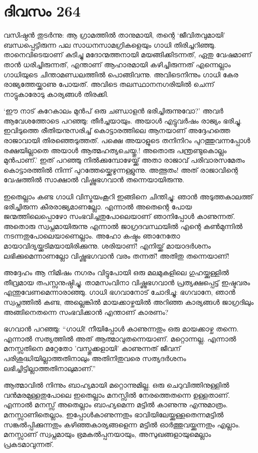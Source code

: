 \section{ദിവസം 264}


വസിഷ്ഠന്‍ തുടര്‍ന്നു: ആ ഗ്രാമത്തില്‍ താനുമായി, തന്റെ ‘ജീവിതവുമായി’ ബന്ധപ്പെട്ടിരുന്ന പല സാധനസാമഗ്രികളെയും ഗാധി തിരിച്ചറിഞ്ഞു. താനെവിടെയാണ് കുടിച്ചു മദോന്മത്തനായി മയങ്ങിക്കിടന്നത്, ഏതു വേഷമാണ് താന്‍ ധരിച്ചിരുന്നത്, എന്താണ് ആഹാരമായി കഴിച്ചിരുന്നത് എന്നെല്ലാം ഗാധിയുടെ ചിന്താമണ്ഡലത്തില്‍ പൊങ്ങിവന്നു. അവിടെനിന്നും ഗാധി കേര രാജ്യത്തേയ്ക്കാണു പോയത്. അവിടെ തലസ്ഥാനനഗരിയില്‍ ചെന്ന് നാട്ടുകാരോടു കാര്യങ്ങള്‍ തിരക്കി.

‘ഈ നാട് കുറേകാലം മുന്‍പ് ഒരു ചണ്ഡാളന്‍  ഭരിച്ചിരുന്നുവോ?’ അവര്‍ ആവേശത്തോടെ പറഞ്ഞു: തീര്‍ച്ചയായും. അയാള്‍ എട്ടുവര്‍ഷം രാജ്യം ഭരിച്ചു. ഇവിടുത്തെ രീതിയനുസരിച്ച് കൊട്ടാരത്തിലെ ആനയാണ് അദ്ദേഹത്തെ രാജാവായി തിരഞ്ഞെടുത്തത്. പക്ഷെ അയാളുടെ തനിനിറം പുറത്തുവന്നപ്പോള്‍ രക്ഷയില്ലാതെ അയാള്‍ ആത്മഹത്യചെയ്തു.! അതൊരു പന്ത്രണ്ടുകൊല്ലം മുന്‍പാണ്.’ ഇത് പറഞ്ഞു നില്‍ക്കുമ്പോഴേയ്ക്ക് അതാ രാജാവ് പരിവാരസമേതം കൊട്ടാരത്തില്‍ നിന്ന് പുറത്തേയ്ക്കെഴുന്നള്ളുന്നു. അത്ഭുതം! അത് രാജാവിന്റെ വേഷത്തില്‍ സാക്ഷാല്‍ വിഷ്ണുഭഗവാന്‍ തന്നെയായിരുന്നു.

ഇതെല്ലാം കണ്ട ഗാധി വിസ്മയംകൂറി ഇങ്ങിനെ ചിന്തിച്ചു: ഞാന്‍ അടുത്തകാലത്ത് ഭരിച്ചിരുന്ന കീരരാജ്യമാണല്ലോ. എന്നാല്‍ അതെന്റെ പോയ ജന്മത്തിലെപ്പൊഴോ സംഭവിച്ചതുപോലെയാണ് ഞാനിപ്പോള്‍ കാണുന്നത്. അതൊരു സ്വപ്നമായിരുന്നു എന്നാല്‍ ജാഗ്രദവസ്ഥയില്‍ എന്റെ കണ്‍മുന്നില്‍ നടന്നതുപോലെയാണെല്ലാം. അഹോ കഷ്ടം ഞാനേതോ മായാവിദ്യയ്ക്കടിമയായിരിക്കുന്നു. ശരിയാണ്! എനിയ്ക്ക് മായാദര്‍ശനം ലഭിക്കുമെന്നാണല്ലോ വിഷ്ണുഭഗവാന്‍ വരം തന്നത്! അതിതു തന്നെയാണ്!  

അദ്ദേഹം ആ നിമിഷം നഗരം വിട്ടുപോയി ഒരു മലമുകളിലെ ഗുഹയ്ക്കുള്ളില്‍ തീവ്രമായ തപസ്സനുഷ്ഠിച്ചു. താമസംവിനാ വിഷ്ണുഭഗവാന്‍ പ്രത്യക്ഷപ്പെട്ട് ഇഷ്ടവരം എന്തുവേണമെന്നാരാഞ്ഞു. ഗാധി ഭഗവാനോട് ചോദിച്ചു: ഭഗവാനേ, ഞാന്‍ സ്വപ്നത്തില്‍ കണ്ട, അല്ലെങ്കില്‍ മായക്കാഴ്ചയില്‍ അറിഞ്ഞ കാര്യങ്ങള്‍ ജാഗ്രദിലും അങ്ങിനെതന്നെ സംഭവിക്കാന്‍ എന്താണ് കാരണം?

ഭഗവാന്‍ പറഞ്ഞു: “ഗാധി! നീയിപ്പോള്‍ കാണുന്നതും ഒരു മായക്കാഴ്ച തന്നെ. എന്നാല്‍ സത്യത്തില്‍ അത് ആത്മാവുതന്നെയാണ്. മറ്റൊന്നല്ല. എന്നാല്‍ മനസ്സതിനെ മറ്റേതോ 'വസ്തുക്കളായി' കാണുന്നത് ജീവന് പരിശുദ്ധിയില്ലാത്തതിനാലും അതിനിതുവരെ സത്യദര്‍ശനം ലഭിച്ചിട്ടില്ലാത്തതിനാലുമാണ്.”  

ആത്മാവില്‍ നിന്നും ബാഹ്യമായി മറ്റൊന്നുമില്ല. ഒരു ചെറുവിത്തിനുള്ളില്‍ വന്‍മരമുള്ളതുപോലെ ഇതെല്ലാം മനസ്സില്‍ നേരത്തെതന്നെ ഉള്ളതാണ്. എന്നാല്‍ മനസ്സ് അതെല്ലാം ബാഹ്യമെന്ന മട്ടില്‍ കാണുന്നു എന്നുമാത്രം. മനസ്സാണിതെല്ലാം. ഇപ്പോള്‍കാണുന്നതും ഭാവിയിലേയ്ക്കുള്ളതെന്നമട്ടില്‍  സങ്കല്‍പ്പിക്കുന്നതും കഴിഞ്ഞകാര്യങ്ങളെന്ന മട്ടില്‍ ഓര്‍ത്തുവയ്ക്കുന്നതും എല്ലാം. മനസ്സാണ് സ്വപ്നമായും ഭ്രമകല്‍പ്പനയായും, അസുഖങ്ങളായുമെല്ലാം പ്രകടമാവുന്നത്.
   
